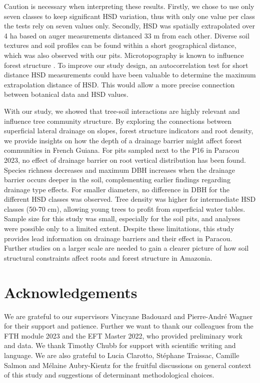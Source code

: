 \documentclass[fleqn,11pt]{latex/stylish_article} %
\begin{document}
Caution is necessary when interpreting these results. Firstly, we chose to use only seven classes to keep significant HSD variation, thus with only one value per class the tests rely on seven values only. Secondly, HSD was spatially extrapolated over 4 ha based on auger measurements distanced 33 m from each other. Diverse soil textures and soil profiles can be found within a short geographical distance, which was also observed with our pits. Microtopography is known to influence forest structure \citep{schwartzTopographyTraitsModulate2020}. To improve our study design, an autocorrelation test for short distance HSD measurements could have been valuable to determine the maximum extrapolation distance of HSD. This would allow a more precise connection between botanical data and HSD values.

With our study, we showed that tree-soil interactions are highly relevant and influence tree community structure. By exploring the connections between superficial lateral drainage on slopes, forest structure indicators and root density, we provide insights on how the depth of a drainage barrier might affect forest communities in French Guiana. For pits sampled next to the P16 in Paracou 2023, no effect of drainage barrier on root vertical distribution has been found. Species richness decreases and maximum DBH increases when the drainage barrier occurs deeper in the soil, complementing earlier findings regarding drainage type effects. For smaller diameters, no difference in DBH for the different HSD classes was observed. Tree density was higher for intermediate HSD classes (50-70 cm), allowing young trees to profit from superficial water tables. Sample size for this study was small, especially for the soil pits, and analyses were possible only to a limited extent. Despite these limitations, this study provides lead information on drainage barriers and their effect in Paracou. Further studies on a larger scale are needed to gain a clearer picture of how soil structural constraints affect roots and forest structure in Amazonia.

\hypertarget{acknowledgements}{%
\section{Acknowledgements}\label{acknowledgements}}

We are grateful to our supervisors Vincyane Badouard and Pierre-André Wagner for their support and patience. Further we want to thank our colleagues from the FTH module 2023 and the EFT Master 2022, who provided preliminary work and data. We thank Timothy Chubb for support with scientific writing and language. We are also grateful to Lucia Clarotto, Stéphane Traissac, Camille Salmon and Mélaine Aubry-Kientz for the fruitful discussions on general context of this study and suggestions of determinant methodological choices.
\end{document}
